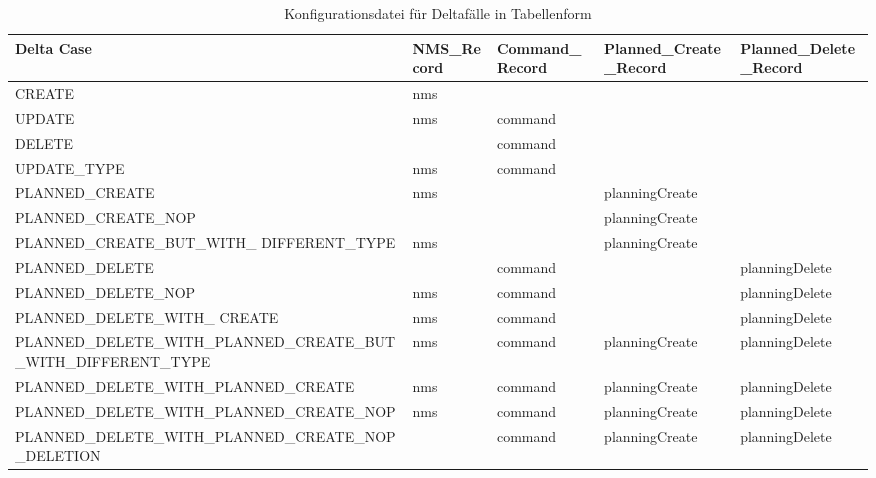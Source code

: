\begin{sidewaystable}
\begin{center}
    \scriptsize
    \begin{tabular}{| >{\raggedright\arraybackslash}m{39.5em} | >{\raggedright\arraybackslash}m{5em} | >{\raggedright\arraybackslash}m{7em} | >{\raggedright\arraybackslash}m{10em} | >{\raggedright\arraybackslash}m{10em} |}
        \hline
         Delta Case & NMS\_Record & Command\_Record & Planned\_Create\_Record & Planned\_Delete\_Record \\ 
         \hline\hline
         CREATE & nms & & & \\ 
         \hline
         UPDATE & nms & command & & \\  
         \hline
         DELETE & & command & & \\ 
         \hline
         UPDATE\_TYPE & nms & command & & \\ 
         \hline
         PLANNED\_CREATE & nms & & planningCreate & \\ 
         \hline
         PLANNED\_CREATE\_NOP & & & planningCreate & \\ 
         \hline
         PLANNED\_CREATE\_BUT\_WITH\_ DIFFERENT\_TYPE & nms & & planningCreate & \\ 
         \hline
         PLANNED\_DELETE & & command & & planningDelete \\ 
         \hline
         PLANNED\_DELETE\_NOP & nms & command & & planningDelete \\ 
         \hline
         PLANNED\_DELETE\_WITH\_ CREATE & nms & command & & planningDelete \\ 
         \hline
         PLANNED\_DELETE\_WITH\_PLANNED\_CREATE\_BUT\_WITH\_DIFFERENT\_TYPE & nms & command & planningCreate & planningDelete \\ 
         \hline
         PLANNED\_DELETE\_WITH\_PLANNED\_CREATE & nms & command & planningCreate & planningDelete \\ 
         \hline
         PLANNED\_DELETE\_WITH\_PLANNED\_CREATE\_NOP & nms & command & planningCreate & planningDelete \\ 
         \hline
         PLANNED\_DELETE\_WITH\_PLANNED\_CREATE\_NOP\_DELETION & & command & planningCreate & planningDelete \\ 
        \hline
    \end{tabular}
    \caption{Konfigurationsdatei für Deltafälle in Tabellenform}\label{tab:deltaConfig}
\end{center}
\end{sidewaystable}

